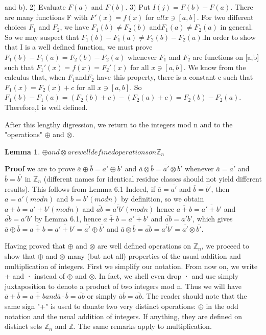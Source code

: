 \documentclass{article}
\newtheorem{lemma}[theorem]{Lemma}
\begin{document}

and b). 2) Evaluate $F(a)$ and $F(b)$. 3) Put $I(j) = F(b)- F(a)$. There are
many functions F with $F'(x) = f(x)$ for $all x \ni [a,b]$. For two different
choices $F_1$ and $F_2$, we have $F_1(b) \neq  F_2(b)$ and$ F_1(a) \neq F_2(a)$ in general. So we may suspect that $F_1(b) - F_1(a) \neq F_2(b) - F_2(a)$.In order to show that I is a well defined function, we must prove $F_1 (b) - F_1 (a) = F_2(b) - F_2(a)$
whenever $F_1$ and $F_2$ are functions on [a,b] such that $F_1'(x) = f(x) = F_2'(x)$
for all $x \ni[a,b]$. We know from the calculus that, when $F_1 $and$ F_2$ have
this property, there is a constant c such that $F_1(x) = F_2(x) + c$ for all
$x \ni [a,b]$. So $F_1(b) - F_1(a) = (F_2(b) +c) - (F_2(a) + c)= F_2(b )- F_2(a)$. Therefore,I is well defined. 

After this lengthy digression, we return to the integers mod n and to the
"operations" $\oplus$ and $\otimes$.


\begin{lemma}
$\oplus and \otimes are well defined operations on \mathbb{Z}_n$
\end{lemma}

\textbf{Proof} we are to prove $\overline{a} \oplus \overline{b} = \overline{a'} \oplus \overline{b'}$ and $\overline{a} \otimes \overline{b} = \overline{a'} \otimes \overline{b'}$ whenever $\overline{a} = \overline{a'}$ and $\overline{b} = \overline{b'}$ in $\mathbb{Z}_n$ (different names for identical residue classes should not yield different results). This follows from Lemma 6.1 Indeed, if $\overline{a} = \overline{a'}$ and $\overline{b} = \overline{b'}$, then $a = a' (mod  n)$ and $b = b' (mod  n)$ by definition, so we obtain $a + b = a' + b' (mod  n)$ and $\overline{ab} = \overline{a'b'} (mod  n)$ hence $\overline{a+b} = \overline{a' + b'}$ and $\overline{ab} = \overline{a'b'}$ by Lemma 6.1, hence $\overline{a+b} = \overline{a'+b'}$ and $\overline{ab} = \overline{a'b'}$, which gives $\overline{a} \oplus \overline{b} = \overline{a+b} = \overline{a'+b'} = \overline{a'} \oplus \overline{b'} $ and $\overline{a} \otimes \overline{b} = \overline{ab} = \overline{a'b'} = \overline{a'} \otimes \overline{b'}$.

Having proved that $\oplus$ and $\otimes$ are well defined operations on $ \mathbb{Z}_n$, we proceed to show that $\oplus$ and $\otimes$ many (but not all) properties of the usual addition and multiplication of integers. First we simplify our notation. From now on, we write + and · instead of $\oplus$ and $\otimes$. In fact, we shell even drop · and use simply juxtaposition to denote a product of two integers mod n. Thus we will have $\overline{a} + \overline{b} = \overline{a+b} and \overline{a} · \overline{b} = \overline{ab}$ or simply $\overline{a}\overline{b} = \overline{ab}$. The reader should note that the same sign "+" is used to donate two very distinct operations: $\oplus$ in the odd notation and the usual addition of integers. If anything, they are defined on distinct sets $\mathbb{Z}_n$ and $\mathbb{Z}$. The same remarks apply to multiplication.
\end{document}
